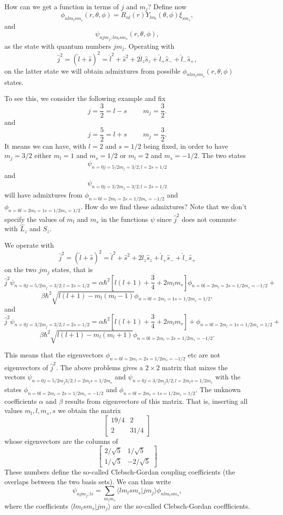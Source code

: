 \documentclass[graybox,sectrefs,envcountresetchap,open=right]{svmonodo}
\begin{document}
How can we get a function in terms of $j$ and $m_j$?
Define now
\[
\phi_{nlm_lsm_s}(r,\theta,\phi)=R_{nl}(r)Y_{lm_l}(\theta,\phi)\xi_{sm_s},
\]
and
\[
\psi_{njm_j;lm_lsm_s}(r,\theta,\phi),
\]
as the state with quantum numbers $jm_j$.
Operating with 
\[
   \hat{j}^2=(\hat{l}+\hat{s})^2=\hat{l}^2+\hat{s}^2+2\hat{l}_z\hat{s}_z+\hat{l}_+\hat{s}_{-}+\hat{l}_{-}\hat{s}_{+},
\]
on the latter state we will obtain admixtures from possible $\phi_{nlm_lsm_s}(r,\theta,\phi)$ states.

To see this, we consider the following example and fix
\[
j=\frac{3}{2}=l-s\hspace{1cm} m_j=\frac{3}{2}.
\]
and
\[
j=\frac{5}{2}=l+s\hspace{1cm} m_j=\frac{3}{2}.
\]
It means we can have, with $l=2$ and $s=1/2$ being fixed, in order to have $m_j=3/2$ either $m_l=1$ and $m_s=1/2$ or
$m_l=2$ and $m_s=-1/2$. The two states    
\[
\psi_{n=0j=5/2m_j=3/2;l=2s=1/2}
\]
and
\[
\psi_{n=0j=3/2m_j=3/2;l=2s=1/2}
\]
will have admixtures from $\phi_{n=0l=2m_l=2s=1/2m_s=-1/2}$ and $\phi_{n=0l=2m_l=1s=1/2m_s=1/2}$. 
How do we find these admixtures? Note that we don't specify the values of $m_l$ and $m_s$ 
in the functions $\psi$ since    
$\hat{j}^2$ does not commute with $\hat{L}_z$ and $\hat{S}_z$. 

We operate with 
\[
   \hat{j}^2=(\hat{l}+\hat{s})^2=\hat{l}^2+\hat{s}^2+2\hat{l}_z\hat{s}_z+\hat{l}_+\hat{s}_{-}+\hat{l}_{-}\hat{s}_{+}
\]
on the two $jm_j$ states, that is
\[
\hat{j}^2\psi_{n=0j=5/2m_j=3/2;l=2s=1/2}= \alpha\hbar^2[l(l+1)+\frac{3}{4}+2m_lm_s]\phi_{n=0l=2m_l=2s=1/2m_s=-1/2}+
\]
\[
\beta\hbar^2\sqrt{l(l+1)-m_l(m_l-1)}\phi_{n=0l=2m_l=1s=1/2m_s=1/2},
\]
and
\[
\hat{j}^2\psi_{n=0j=3/2m_j=3/2;l=2s=1/2}= \alpha\hbar^2[l(l+1)+\frac{3}{4}+2m_lm_s]+ \phi_{n=0l=2m_l=1s=1/2m_s=1/2}+
\]
\[
\beta\hbar^2\sqrt{l(l+1)-m_l(m_l+1)}\phi_{n=0l=2m_l=2s=1/2m_s=-1/2}.
\]



This means that the eigenvectors $\phi_{n=0l=2m_l=2s=1/2m_s=-1/2}$ etc are not eigenvectors of $\hat{j}^2$. The above problems gives a $2\times2$ matrix that mixes the vectors $\psi_{n=0j=5/2m_j3/2;l=2m_ls=1/2m_s}$ and $\psi_{n=0j=3/2m_j3/2;l=2m_ls=1/2m_s}$ with the states  $\phi_{n=0l=2m_l=2s=1/2m_s=-1/2}$ and
$\phi_{n=0l=2m_l=1s=1/2m_s=1/2}$. The unknown coefficients $\alpha$ and $\beta$ results from eigenvectors of this matrix. That is, inserting all values $m_l,l,m_s,s$ we obtain the matrix 
\[
\left[ \begin{array} {cc} 19/4 & 2 \\ 2 & 31/4 \end{array} \right]\]
whose eigenvectors are the columns of
\[
\left[ \begin{array} {cc} 2/\sqrt{5} &1/\sqrt{5}  \\ 1/\sqrt{5} & -2/\sqrt{5} \end{array}\right]\]  
These numbers define the so-called Clebsch-Gordan coupling coefficients  (the overlaps between the two basis sets). We can thus write
\[
\psi_{njm_j;ls}=\sum_{m_lm_s}\langle lm_lsm_s|jm_j\rangle\phi_{nlm_lsm_s},
\]
where the coefficients $\langle lm_lsm_s|jm_j\rangle$ are the so-called Clebsch-Gordan coeffficients.
\end{document}

